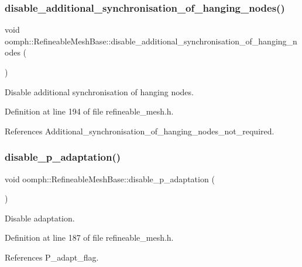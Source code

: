 \subsubsection{\texorpdfstring{disable\+\_\+additional\+\_\+synchronisation\+\_\+of\+\_\+hanging\+\_\+nodes()}{disable\_additional\_synchronisation\_of\_hanging\_nodes()}}
{\footnotesize\ttfamily void oomph\+::\+Refineable\+Mesh\+Base\+::disable\+\_\+additional\+\_\+synchronisation\+\_\+of\+\_\+hanging\+\_\+nodes (\begin{DoxyParamCaption}{ }\end{DoxyParamCaption})\hspace{0.3cm}{\ttfamily [inline]}}



Disable additional synchronisation of hanging nodes. 



Definition at line 194 of file refineable\+\_\+mesh.\+h.



References Additional\+\_\+synchronisation\+\_\+of\+\_\+hanging\+\_\+nodes\+\_\+not\+\_\+required.

\mbox{\label{classoomph_1_1RefineableMeshBase_a7265c7cdcf5ac2c9a043739eb9497aec}} 
\subsubsection{\texorpdfstring{disable\+\_\+p\+\_\+adaptation()}{disable\_p\_adaptation()}}
{\footnotesize\ttfamily void oomph\+::\+Refineable\+Mesh\+Base\+::disable\+\_\+p\+\_\+adaptation (\begin{DoxyParamCaption}{ }\end{DoxyParamCaption})\hspace{0.3cm}{\ttfamily [inline]}}



Disable adaptation. 



Definition at line 187 of file refineable\+\_\+mesh.\+h.



References P\+\_\+adapt\+\_\+flag.

\mbox{\label{classoomph_1_1RefineableMeshBase_a9f54bbde6fbfe2fef719c4d3fa5e0ae7}} 

